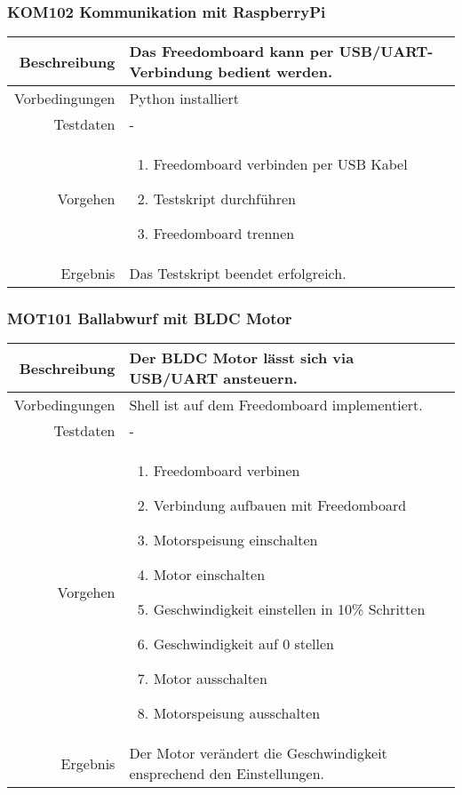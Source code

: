 \subsubsection{KOM102 Kommunikation mit RaspberryPi}
\begin{table}[h!]
	\renewcommand{\arraystretch}{1.5}
	\begin{tabular}{|r|p{14cm}|}
		\hline Beschreibung	&
			Das Freedomboard kann per USB/UART-Verbindung bedient werden. \\ 
		\hline Vorbedingungen	& Python installiert \\ 
		\hline Testdaten	& - \\ 
		\hline Vorgehen		& 
		\begin{enumerate}
			\item Freedomboard verbinden per USB Kabel
			\item Testskript durchführen
			\item Freedomboard trennen
		\end{enumerate} \\ 
		\hline Ergebnis 	&
			Das Testskript beendet erfolgreich.\\ 
		\hline 
	\end{tabular}
\end{table}

\newpage
\subsubsection{MOT101 Ballabwurf mit BLDC Motor}
\begin{table}[h!]
	\renewcommand{\arraystretch}{1.5}
	\begin{tabular}{|r|p{14cm}|}
		\hline Beschreibung	& Der BLDC Motor lässt sich via USB/UART ansteuern. \\ 
		\hline Vorbedingungen	& Shell ist auf dem Freedomboard implementiert. \\ 
		\hline Testdaten	& - \\ 
		\hline Vorgehen		& 
		\begin{enumerate}
			\item Freedomboard verbinen
			\item Verbindung aufbauen mit Freedomboard
			\item Motorspeisung einschalten
			\item Motor einschalten
			\item Geschwindigkeit einstellen in 10\% Schritten
			\item Geschwindigkeit auf 0 stellen
			\item Motor ausschalten
			\item Motorspeisung ausschalten 
		\end{enumerate} \\ 
		\hline Ergebnis 	&
			Der Motor verändert die Geschwindigkeit ensprechend
			den Einstellungen.\\ 
		\hline 
	\end{tabular}
\end{table}

